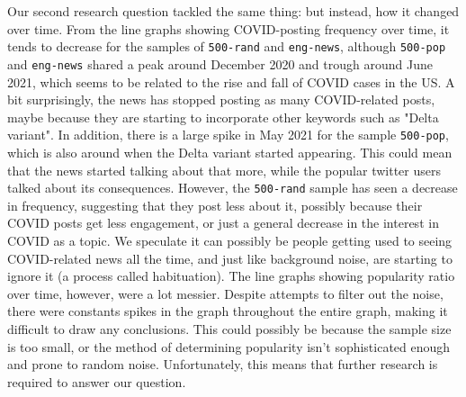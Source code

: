 \documentclass{article}
\begin{document}
    Our second research question tackled the same thing: but instead, how it changed over time. From the line graphs showing COVID-posting frequency over time, it tends to decrease for the samples of \texttt{500-rand} and \texttt{eng-news}, although \texttt{500-pop} and \texttt{eng-news} shared a peak around December 2020 and trough around June 2021, which seems to be related to the rise and fall of COVID cases in the US. A bit surprisingly, the news has stopped posting as many COVID-related posts, maybe because they are starting to incorporate other keywords such as "Delta variant". In addition, there is a large spike in May 2021 for the sample \texttt{500-pop}, which is also around when the Delta variant started appearing. This could mean that the news started talking about that more, while the popular twitter users talked about its consequences. However, the \texttt{500-rand} sample has seen a decrease in frequency, suggesting that they post less about it, possibly because their COVID posts get less engagement, or just a general decrease in the interest in COVID as a topic. We speculate it can possibly be people getting used to seeing COVID-related news all the time, and just like background noise, are starting to ignore it (a process called habituation).
    The line graphs showing popularity ratio over time, however, were a lot messier. Despite attempts to filter out the noise, there were constants spikes in the graph throughout the entire graph, making it difficult to draw any conclusions. This could possibly be because the sample size is too small, or the method of determining popularity isn't sophisticated enough and prone to random noise. Unfortunately, this means that further research is required to answer our question.    
    
\nocite{*}
\printbibliography
\end{document}
